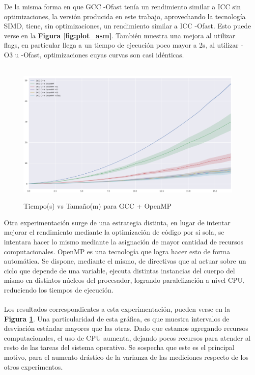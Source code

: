 De la misma forma en que GCC -Ofast tenía un rendimiento similar a ICC sin optimizaciones, la versión producida en este trabajo, aprovechando la tecnología SIMD, tiene, sin optimizaciones, un rendimiento similar a ICC -Ofast. Esto puede verse en la \textbf{Figura \ref{fig:plot_asm}}. También muestra una mejora al utilizar flags, en particular llega a un tiempo de ejecución poco mayor a 2s, al utilizar -O3 u -Ofast, optimizaciones cuyas curvas son casi idénticas.
~\\
~\\
\begin{figure}[!htbp]
\caption{Tiempo(s) vs Tamaño(m) para GCC + OpenMP}
\includegraphics[width=\textwidth]{imagenes/plot_omp.png}
\label{fig:plot_omp}
\end{figure}
Otra experimentación surge de una estrategia distinta, en lugar de intentar mejorar el rendimiento mediante la optimización de código por si sola, se intentara hacer lo mismo mediante la asignación de mayor cantidad de recursos computacionales. OpenMP es una tecnología que logra hacer esto de forma automática. Se dispone, mediante el mismo, de directivas que al actuar sobre un ciclo que depende de una variable, ejecuta distintas instancias del cuerpo del mismo en distintos núcleos del procesador, logrando paralelización a nivel CPU, reduciendo los tiempos de ejecución.
~\\
~\\
Los resultados correspondientes a esta experimentación, pueden verse en la \textbf{Figura \ref{fig:plot_omp}}. Una particularidad de esta gráfica, es que muestra intervalos de desviación estándar mayores que las otras. Dado que estamos agregando recursos computacionales, el uso de CPU aumenta, dejando pocos recursos para atender al resto de las tareas del sistema operativo. Se sospecha que este es el principal motivo, para el aumento drástico de la varianza de las mediciones respecto de los otros experimentos.
